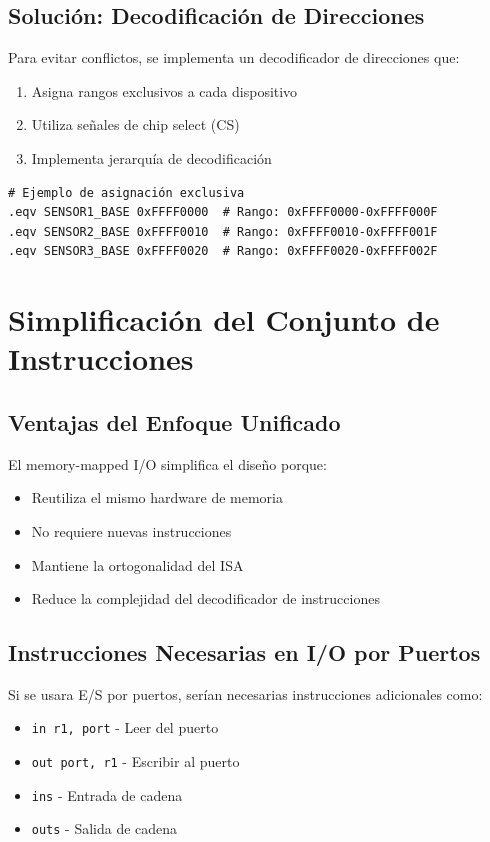 \documentclass[12pt,a4paper]{article}
\begin{document}
\subsection{Solución: Decodificación de Direcciones}
Para evitar conflictos, se implementa un decodificador de direcciones que:
\begin{enumerate}
    \item Asigna rangos exclusivos a cada dispositivo
    \item Utiliza señales de chip select (CS)
    \item Implementa jerarquía de decodificación
\end{enumerate}

\begin{lstlisting}[style=mipsstyle]
# Ejemplo de asignación exclusiva
.eqv SENSOR1_BASE 0xFFFF0000  # Rango: 0xFFFF0000-0xFFFF000F
.eqv SENSOR2_BASE 0xFFFF0010  # Rango: 0xFFFF0010-0xFFFF001F
.eqv SENSOR3_BASE 0xFFFF0020  # Rango: 0xFFFF0020-0xFFFF002F
\end{lstlisting}

\section{Simplificación del Conjunto de Instrucciones}

\subsection{Ventajas del Enfoque Unificado}
El memory-mapped I/O simplifica el diseño porque:
\begin{itemize}
    \item Reutiliza el mismo hardware de memoria
    \item No requiere nuevas instrucciones
    \item Mantiene la ortogonalidad del ISA
    \item Reduce la complejidad del decodificador de instrucciones
\end{itemize}

\subsection{Instrucciones Necesarias en I/O por Puertos}
Si se usara E/S por puertos, serían necesarias instrucciones adicionales como:
\begin{itemize}
    \item \texttt{in r1, port} - Leer del puerto
    \item \texttt{out port, r1} - Escribir al puerto
    \item \texttt{ins} - Entrada de cadena
    \item \texttt{outs} - Salida de cadena
\end{itemize}
\end{document}

